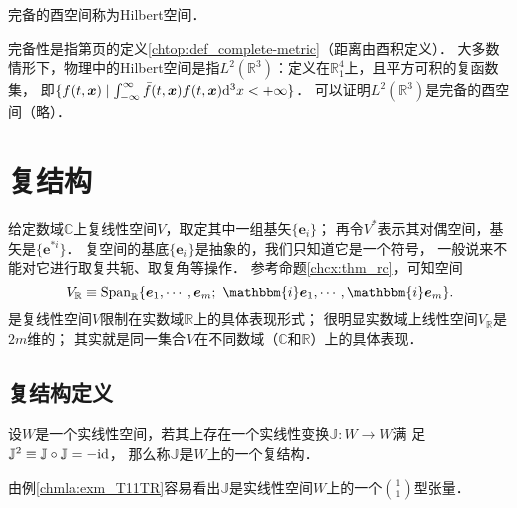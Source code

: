 \begin{definition}\label{chcx:def_Hilbert-Space}
	完备的酉空间称为Hilbert空间．
\end{definition}
完备性是指第\pageref{chtop:def_complete-metric}页的定义\ref{chtop:def_complete-metric}（距离由酉积定义）．
大多数情形下，物理中的Hilbert空间是指$L^2(\mathbb{R}^3)$：定义在$\mathbb{R}^4_1$上，且平方可积的复函数集，
即$\{f(t,\boldsymbol{x}) \mid \int_{-\infty}^{\infty} 
\bar{f}(t,\boldsymbol{x}) f(t,\boldsymbol{x}) {\rm d}^3x  < +\infty \}$．
可以证明$L^2(\mathbb{R}^3)$是完备的酉空间（略）．




\section{复结构}\label{chcx:sec_cpstru}
给定数域$\mathbb{C}$上复线性空间$V$，取定其中一组基矢$\{\boldsymbol{e}_i\}$；
再令$V^*$表示其对偶空间，基矢是$\{\boldsymbol{e}^{*i}\}$．
复空间的基底$\{\boldsymbol{e}_i\}$是抽象的，我们只知道它是一个符号，
一般说来不能对它进行取复共轭、取复角等操作．
参考命题\ref{chcx:thm_rc}，可知空间
\begin{equation}\label{chcx:eqn_VR}
    V_{\mathbb{R}} \equiv {\rm Span}_{\mathbb{R}}\{\boldsymbol{e}_1,\cdots,\boldsymbol{e}_m;\  
    \mathbbm{i}\boldsymbol{e}_1,\cdots,\mathbbm{i}\boldsymbol{e}_m\} .
\end{equation}
是复线性空间$V$限制在实数域$\mathbb{R}$上的具体表现形式；
很明显实数域上线性空间$V_{\mathbb{R}}$是$2m$维的；
其实就是同一集合$V$在不同数域（$\mathbb{C}$和$\mathbb{R}$）上的具体表现．

\subsection{复结构定义}



\begin{definition}
    设$W$是一个实线性空间，若其上存在一个实线性变换$\mathbb{J}:W\to W$满
    足$\mathbb{J}^2\equiv \mathbb{J}\circ \mathbb{J}=-{\rm id}$，
    那么称$\mathbb{J}$是$W$上的一个{\heiti 复结构}．
\end{definition}
由例\ref{chmla:exm_T11TR}容易看出$\mathbb{J}$是实线性空间$W$上的一个$\binom{1}{1}$型张量．


